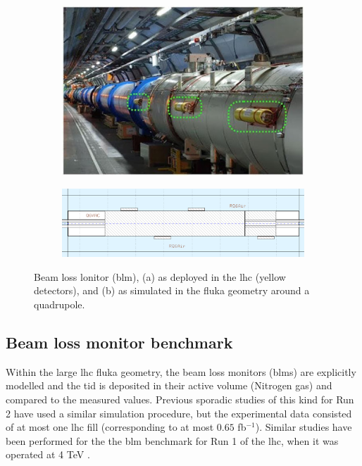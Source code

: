 \documentclass[encoding=utf8,british]{tumphthesis}
\begin{document}
\begin{figure}[H]
\centering
\begin{subfigure}{.285\textwidth}
  \centering
  \includegraphics[width=1.0\linewidth]{figures/BLMs_real.jpg}
  \caption{}
  \label{fig:lhc-blm-real}
\end{subfigure}%
\begin{subfigure}{.70\textwidth}
  \centering
  \includegraphics[width=1.0\linewidth]{figures/BLMs_simulated.png}
  \caption{}
  \label{fig:lhc-blm-FLUKA}
\end{subfigure}
\caption{Beam loss lonitor (\acrshort{blm}), (a) as deployed in the \acrshort{lhc} (yellow detectors), and (b) as simulated in the \acrshort{fluka} geometry around a quadrupole.}
\label{fig:lhc-blm-geometry}
\end{figure}



\subsection{Beam loss monitor benchmark}
\label{section:LHC-benchmark-blms}

Within the large \acrshort{lhc} \acrshort{fluka} geometry, the beam loss monitors (\acrshort{blm}s) are explicitly modelled and the \acrshort{tid} is deposited in their active volume (Nitrogen gas) and compared to the measured values. Previous sporadic studies of this kind for Run 2 \cite{Tsinganis:benchmark-previous-1, Tsinganis:benchmark-previous-2} have used a similar simulation procedure, but the experimental data consisted of at most one \acrshort{lhc} fill (corresponding to at most $0.65$ fb$^{-1}$). Similar studies have been performed for the the \acrshort{blm} benchmark for Run 1 of the \acrshort{lhc}, when it was operated at 4 TeV \cite{BOCCONE2014215, PhysRevAccelBeams.22.071003}.
\end{document}
